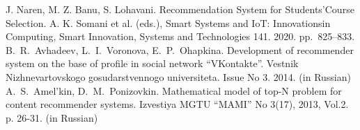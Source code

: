 \documentclass[conference,a4]{IEEEtran}
\begin{document}
\begin{thebibliography}{99}
J. Naren, M. Z. Banu, S. Lohavani. Recommendation System for Students’Course Selection. A. K. Somani et al. (eds.), Smart Systems and IoT: Innovationsin Computing, Smart Innovation, Systems and Technologies 141. 2020. pp.~825--833. 
 B.~R.~Avhadeev, L.~I.~Voronova, E.~P.~Ohapkina. Development of recommender system on the base of profile in social network ``VKontakte''. Vestnik Nizhnevartovskogo gosudarstvennogo universiteta. Issue No 3. 2014. (in Russian)
A.~S.~Amel'kin, D.~M.~Ponizovkin. Mathematical model of top-N problem for content recommender systems. Izvestiya MGTU ``MAMI'' No 3(17), 2013, Vol.2. p. 26-31. (in Russian)
\end{thebibliography}
\end{document}
